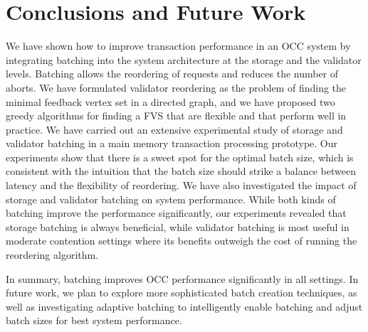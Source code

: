 \section{Conclusions and Future Work}\label{sec:conclusion}
We have shown how to improve transaction performance in an OCC system by integrating batching into the system architecture at the storage and the validator levels. Batching allows the reordering of requests and reduces the number of aborts. We have formulated validator reordering as the problem of finding the minimal feedback vertex set in a directed graph, and we have proposed two greedy algorithms for finding a FVS that are flexible and that perform well in practice. We have carried out an extensive experimental study of storage and validator batching in a main memory transaction processing prototype. Our experiments show that there is a sweet spot for the optimal batch size, which is consistent with the intuition that the batch size should strike a balance between latency and the flexibility of reordering. We have also investigated the impact of storage and validator batching on system performance. While both kinds of batching improve the performance significantly, our experiments revealed that storage batching is always beneficial, while validator batching is most useful in moderate contention settings where its benefits outweigh the cost of running the reordering algorithm.

In summary, batching improves OCC performance significantly in all settings. In future work, we plan to explore more sophisticated batch creation techniques, as well as investigating adaptive batching to intelligently enable batching and adjust batch sizes for best system performance.


